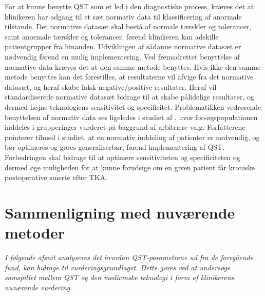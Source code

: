 For at kunne benytte QST som et led i den diagnostiske process, kræves det at klinikeren har adgang til et sæt normativ data til klassificering af anormale tilstande. Det normative datasæt skal bestå af normale tærskler og tolerancer, samt anormale tærskler og tolerancer, førend klinikeren kan adskille patientgrupper fra hinanden. Udviklingen af sådanne normative datasæt er nødvendig førend en mulig implementering. Ved fremadrettet benyttelse af normative data kræves det at den samme metode benyttes. Hvis ikke den samme metode benyttes kan det forestilles, at resultaterne vil afvige fra det normative datasæt, og heraf skabe falsk negative/positive resultater. Heraf vil standardiserede normative datasæt bidrage til at skabe pålidelige resultater, og dermed højne teknologiens sensitivitet og specificitet. \citep{Yarnitsky1997} Problematikken vedrørende benyttelsen af normativ data ses ligeledes i studiet af , hvor forsøgspopulationen inddeles i grupperinger vurderet på baggrund af arbitrære valg. Forfatterene pointerer tilmed i studiet, at en normativ inddeling af patienter er nødvendig, og bør optimeres og gøres generaliserbar, førend implementering af QST. \citep{Petersen2016} Forbedringen skal bidrage til at optimere sensitiviteten og specificiteten og dermed øge muligheden for at kunne forudsige om en given patient får kroniske postoperative smerte efter TKA. 

\section{Sammenligning med nuværende metoder}
\textit{I følgende afsnit analyseres det hvordan QST-parametrene ud fra de foregående fund, kan bidrage til vurderingsgrundlaget. Dette gøres ved at undersøge samspillet mellem QST og den medicinske teknologi i form af klinikerens nuværende vurdering.}

